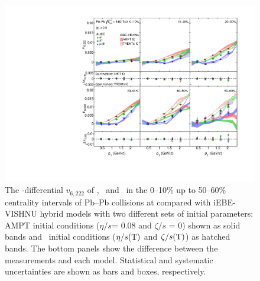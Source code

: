 \begin{figure}[h]
\begin{center}
\includegraphics[scale=0.73]{figures/model/TrentoAndAMPT_v6222_gap00_PID2.pdf}
\end{center}
\caption{The \pT-differential $v_{6,222}$ of \pion, \kaon~and \proton~in the 0--10\% up to 50--60\% centrality intervals of Pb--Pb collisions at \sNN compared with iEBE-VISHNU hybrid models with two different sets of initial parameters: AMPT initial conditions ($\eta/s$= 0.08 and $\zeta/s$ = 0) shown as solid bands and \trento~initial conditions ($\eta/s({\rm T})$ and $\zeta/s({\rm T})$) as hatched bands. The bottom panels show the difference between the measurements and each model. Statistical and systematic uncertainties are shown as bars and boxes, respectively.}
\label{v6222_model}
\end{figure}



